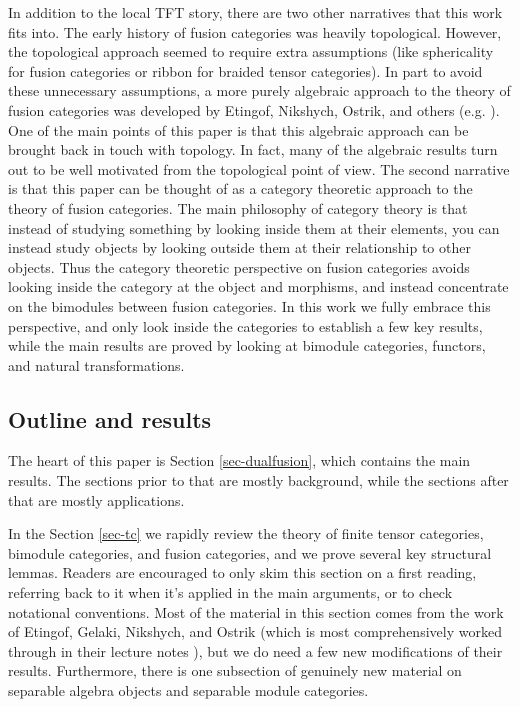 \documentclass{amsart}
\begin{document}
In addition to the local TFT story, there are two other narratives that this work fits into.  The early history of fusion categories was heavily topological.  However, the topological approach seemed to require extra assumptions (like sphericality for fusion categories or ribbon for braided tensor categories).  In part to avoid these unnecessary assumptions, a more purely algebraic approach to the theory of fusion categories was developed by Etingof, Nikshych, Ostrik, and others (e.g. \cite{EGNO, MR2183279,0906.0620,MR2097289}).  One of the main points of this paper is that this algebraic approach can be brought back in touch with topology.  In fact, many of the algebraic results turn out to be well motivated from the topological point of view.   The second narrative is that this paper can be thought of as a category theoretic approach to the theory of fusion categories.  The main philosophy of category theory is that instead of studying something by looking inside them at their elements, you can instead study objects by looking outside them at their relationship to other objects.  Thus the category theoretic perspective on fusion categories avoids looking inside the category at the object and morphisms, and instead concentrate on the bimodules between fusion categories.  In this work we fully embrace this perspective, and only look inside the categories to establish a few key results, while the main results are proved by looking at bimodule categories, functors, and natural transformations.

\subsection{Outline and results}

The heart of this paper is Section \ref{sec-dualfusion}, which contains the main results.  The sections prior to that are mostly background, while the sections after that are mostly applications.

In the Section \ref{sec-tc} we rapidly review the theory of finite tensor categories, bimodule categories, and fusion categories, and we prove several key structural lemmas.  Readers are encouraged to only skim this section on a first reading, referring back to it when it's applied in the main arguments, or to check notational conventions.  Most of the material in this section comes from the work of Etingof, Gelaki, Nikshych, and Ostrik (which is most comprehensively worked through in their lecture notes \cite{EGNO}), but we do need a few new modifications of their results.  Furthermore, there is one subsection of genuinely new material on separable algebra objects and separable module categories.  
\end{document}
